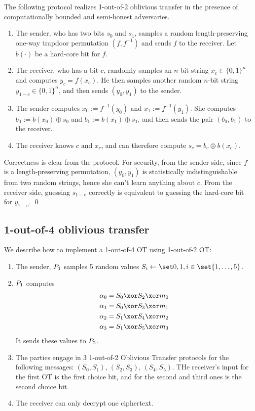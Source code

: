 \begin{theorem}
The following protocol realizes 1-out-of-2 oblivious transfer in the presence of computationally bounded and semi-honest adversaries. 
\begin{enumerate}
\item The sender, who has two bits $s_0$ and $s_1$, samples a random length-preserving one-way trapdoor permutation $(f, f^{-1})$ and sends $f$ to the receiver.  Let $b(\cdot)$ be a hard-core bit for $f$.
\item The receiver, who has a bit $c$, randomly samples an $n$-bit string $x_c \in \{0,1\}^n$ and computes $y_c = f(x_c)$. He then samples another random $n$-bit string $y_{1-c} \in \{0,1\}^n$, and then sends $(y_0, y_1)$ to the sender.
\item The sender computes $x_0 := f^{-1}(y_0)$ and $x_1 := f^{-1}(y_1)$. She computes $b_0 := b(x_0) \oplus s_0$ and $b_1 := b(x_1) \oplus s_1$, and then sends the pair $(b_0, b_1)$ to the receiver.
\item The receiver knows $c$ and $x_c$, and can therefore compute $s_c = b_c \oplus b(x_c)$. 
\end{enumerate}
\end{theorem}
\proof
Correctness is clear from the protocol.	
For security, from the sender side, since $f$ is a length-preserving permutation, $(y_0, y_1)$ is statistically indistinguishable from two random strings, hence she can't learn anything about $c$.
From the receiver side, guessing $s_{1-c}$ correctly is equivalent to guessing the hard-core bit for $y_{1-c}$.
\qed


\subsection{1-out-of-4 oblivious transfer}
  We describe how to implement a 1-out-of-4 OT using 1-out-of-2 OT:\@
  \begin{enumerate}
    \item
      The sender, $P_1$ samples 5 random values $S_i \gets \bits, i \in \set{1,\dotsc, 5}$.
    \item
      $P_1$ computes
      \begin{align*}
        \alpha_0 &= S_0 \xor S_2 \xor m_0\\
        \alpha_1 &= S_0 \xor S_3 \xor m_1\\
        \alpha_2 &= S_1 \xor S_4 \xor m_2\\
        \alpha_3 &= S_1 \xor S_5 \xor m_3
      \end{align*}
      It sends these values to $P_2$.
    \item
      The parties engage in 3 1-out-of-2 Oblivious Transfer protocols for the following
      messages: $(S_0, S_1)$, $(S_2, S_3)$, $(S_4, S_5)$. THe receiver's input for
      the first OT is the first choice bit, and for the second and third ones is
      the second choice bit.
    \item
      The receiver can only decrypt one ciphertext.
  \end{enumerate}


